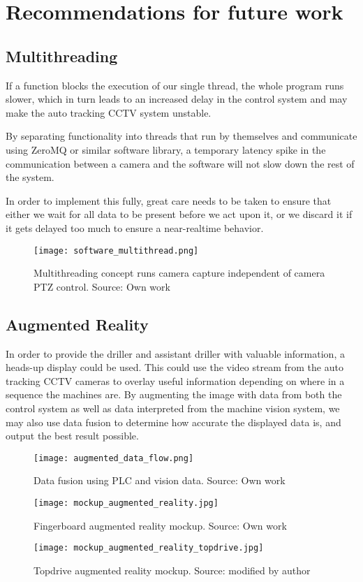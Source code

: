 \section{Recommendations for future work}
\subsection{Multithreading}
If a function blocks the execution of our single thread, the whole program runs slower, which in turn leads to an increased delay in the control system and may make the auto tracking CCTV system unstable.

By separating functionality into threads that run by themselves and communicate using ZeroMQ or similar software library, a temporary latency spike in the communication between a camera and the software will not slow down the rest of the system.

In order to implement this fully, great care needs to  be taken to ensure that either we wait for all data to be present before we act upon it, or we discard it if it gets delayed too much to ensure a near-realtime behavior.

\begin{figure}[ht]
    \centering
    \texttt{[image: software\_multithread.png]}
    \caption{Multithreading concept runs camera capture independent of camera PTZ control. Source: Own work}
    \label{fig:software_multithread}
\end{figure}
\FloatBarrier

\subsection{Augmented Reality}
In order to provide the driller and assistant driller with valuable information, a heads-up display could be used. This could use the video stream from the auto tracking CCTV cameras to overlay useful information depending on where in a sequence the machines are. By augmenting the image with data from both the control system as well as data interpreted from the machine vision system, we may also use data fusion to determine how accurate the displayed data is, and output the best result possible.

\begin{figure}[ht]
    \centering
    \texttt{[image: augmented\_data\_flow.png]}
    \caption{Data fusion using PLC and vision data. Source: Own work}
    \label{fig:augmented_data_flow}
\end{figure}
\FloatBarrier


\begin{figure}[ht]
    \centering
    \texttt{[image: mockup\_augmented\_reality.jpg]}
    \caption{Fingerboard augmented reality mockup. Source: Own work}
    \label{fig:mockup_augmented_reality}
\end{figure}
\FloatBarrier

\begin{figure}[ht]
    \centering
    \texttt{[image: mockup\_augmented\_reality\_topdrive.jpg]}
    \caption{Topdrive augmented reality mockup. Source: \citet{dc15} modified by author}
    \label{fig:mockup_augmented_reality_topdrive}
\end{figure}
\FloatBarrier